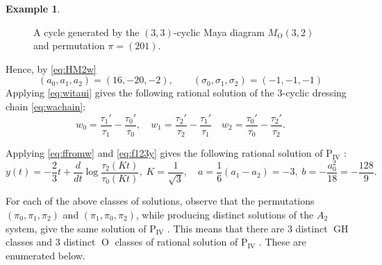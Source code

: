 \documentclass{amsart}
\theoremstyle{definition}
\newtheorem*{example}{Example} %
\newcommand{\PIV}{$\mathrm{P}_{\mathrm{IV}}\,\,$}
\newcommand{\MGH}{\operatorname{GH}}
\newcommand{\MO}{\operatorname{O}}
\begin{document}
\begin{example}
\begin{figure}[ht]
  
\caption{A cycle generated by the $(3,3)$-cyclic  Maya diagram
  $M_{\MO}(3,2)$ and  permutation $\pi=(201)$. }
  \label{fig:31cyclic}
\end{figure}

\noindent
Hence, by \eqref{eq:HM2w}
\[ (a_0,a_1,a_2) = (16,-20,-2),\qquad (\sigma_0,\sigma_1,\sigma_2) =
  (-1,-1,-1)\] Applying \eqref{eq:witaui} gives the following rational
solution of the 3-cyclic dressing chain \eqref{eq:wachain}:
\[
  w_0 = \frac{\tau_1'}{\tau_1} - \frac{\tau_{0}'}{\tau_{0}},\quad w_1
  = \frac{\tau_2'}{\tau_2} - \frac{\tau_{1}'}{\tau_{1}}\quad w_2 =
  \frac{\tau_0'}{\tau_0} - \frac{\tau_{2}'}{\tau_{2}}.
\]

Applying \eqref{eq:ffromw} and \eqref{eq:f123y} gives the following
rational solution of \PIV:
\[ y(t) = -\frac{2}{3}t + \frac{d}{dt} \log
  \frac{\tau_2(Kt)}{\tau_0(Kt)}, \; K=\frac{1}{\sqrt{3}},\quad a=
  \frac16(a_1-a_2)=-3,\; b=-\frac{a_0^2}{18} = -\frac{128}{9} .\]
\end{example}

For each of the above classes of solutions, observe that the
permutations $(\pi_0,\pi_1,\pi_2)$ and $(\pi_1,\pi_0,\pi_2)$, while
producing distinct solutions of the $A_2$ system, give the same
solution of \PIV.  This means that there are 3 distinct $\MGH$ classes
and 3 distinct $\MO$ classes of rational solution of \PIV.  These are
enumerated below.
\end{document}
